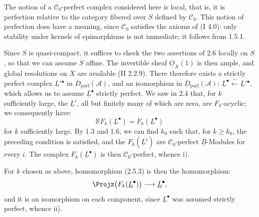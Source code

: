 The notion of a $\mathcal C_0$-perfect complex considered here is local, that is, it is perfection relative to the category fibered over $S$ defined by $\mathcal C_0$. This notion of perfection does have a meaning, since $\mathcal C_0$ satisfies the axioms of (I 4.0): only stability under kernels of epimorphisms is not immediate; it follows from 1.5.1.

Since $S$ is quasi-compact, it suffices to check the two assertions of 2.6 locally on $S$, so that we can assume $S$ affine. The invertible sheaf $\underline{O}_X(1)$ is then ample, and global resolutions on $X$ are available (II 2.2.9). There therefore exists a strictly perfect complex $\underline{L}'{}^{\bullet}$ in $D_{\mathrm{parf}}(\mathcal A)$, and an isomorphism in $D_{\mathrm{parf}}(\mathcal A)$: $\underline{L}^{\bullet}\xleftarrow{\sim}\underline{L}'{}^{\bullet}$, which allows us to assume $\underline{L}^{\bullet}$ strictly perfect. We saw in 2.4 that, for $k$ sufficiently large, the $\underline{L}^i$, all but finitely many of which are zero, are $F_k$-acyclic; we consequently have:
\[
  \mathbb R F_k(\underline{L}^{\bullet})=F_k(\underline{L}^{\bullet})
\]
for $k$ sufficiently large. By 1.3 and 1.6, we can find $k_0$ such that, for $k\geq k_0$, the preceding condition is satisfied, and the $F_k(\underline{L}^i)$ are $\mathcal C_0$-perfect $\underline{B}$-Modules for every $i$. The complex $F_k(\underline{L}^{\bullet})$ is then $\mathcal C_0$-perfect, whence i).

For $k$ chosen as above, homomorphism (2.5.3) is then the homomorphism:
%
\[
  \Projz\bigl(F_k(\underline{L}^{\bullet})\bigr)\longrightarrow \underline{L}^{\bullet},
\]
and it is an isomorphism on each component, since $\underline{L}^{\bullet}$ was assumed strictly perfect, whence ii).

